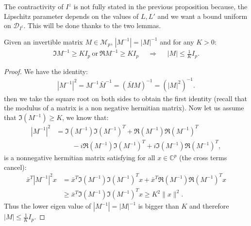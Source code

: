 \documentclass[a4papaer, titlepage]{book}
\begin{document}
The contractivity of $I^z$ is not fully stated in the previous proposition because, the Lipschitz parameter depends on the values of $L,L'$ and we want a bound uniform on $\mathcal D_ {I^z}$. This will be done thanks to the two lemmas. 
\begin{lemma}\label{lem:inverse_module_matrice_commute}
  Given an invertible matrix $M \in \mathcal M_{p}$, 
  $|M^{-1}| = |M|^{-1}$ and for any $K>0$:
  \begin{align*}
    \Im M^{-1} \geq K I_p \ \text{or} \ \Re M^{-1} \geq K I_p&
    &\Longrightarrow&
    & |M| \leq \frac{1}{K} I_p.
  \end{align*}
\end{lemma}
\begin{proof}
  We have the identity:
  \begin{align*}
    |M^{-1}|^2 = M^{-1} \bar{M}^{-1} = (\bar M M)^{-1} =  (|M|^2)^{-1}.
  \end{align*}
  then we take the square root on both sides to obtain the first identity (recall that the modulus of a matrix is a non negative hermitian matrix). Now let us assume that $\Im(M^{-1}) \geq K$, we know that:
  \begin{align*}
    |M^{-1}|^2 
    &= \Im(M^{-1})\Im(M^{-1})^T + \Re(M^{-1})\Re(M^{-1})^T  \\
    &\hspace{1cm}- i \Re(M^{-1})\Im(M^{-1})^T +i \Im(M^{-1})\Re(M^{-1})^T,
  \end{align*}
  is a nonnegative hermitian matrix satisfying for all $x \in \mathbb C^p$ (the cross terms cancel):
  \begin{align*}
    \bar x^T |M^{-1}|^2 x 
    &= \bar x^T \Im(M^{-1})\Im(M^{-1})^T x + \bar x^T \Re(M^{-1})\Re(M^{-1})^T x \\
    &\geq \bar x^T \Im(M^{-1})\Im(M^{-1})^T x \geq K^2 \|x\|^2.
  \end{align*}
  Thus the lower eigen value of $|M^{-1}| = |M|^{-1}$ is bigger than $K$ and therefore $|M| \leq \frac{1}{K}I_p$.

\end{proof}
\end{document}
